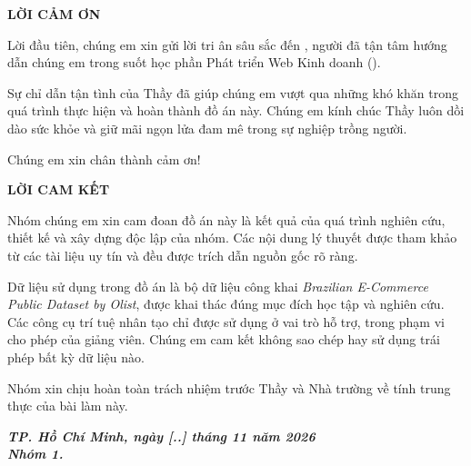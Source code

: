 
\clearpage
\thispagestyle{empty}
\setlength{\parskip}{6pt}  %

\begin{center}
{\bfseries\fontsize{13}{16}\selectfont LỜI CẢM ƠN}
\end{center}

Lời đầu tiên, chúng em xin gửi lời tri ân sâu sắc đến \CoverSupervisor, người đã tận tâm
hướng dẫn chúng em trong suốt học phần Phát triển Web Kinh doanh (\CoverCourseCode).

Sự chỉ dẫn tận tình của Thầy đã giúp chúng em vượt qua những khó khăn trong quá trình
thực hiện và hoàn thành đồ án này. Chúng em kính chúc Thầy luôn dồi dào sức khỏe và giữ
mãi ngọn lửa đam mê trong sự nghiệp trồng người.

Chúng em xin chân thành cảm ơn!

\vspace{0.4cm}

\begin{center}
{\bfseries\fontsize{13}{16}\selectfont LỜI CAM KẾT}
\end{center}

Nhóm chúng em xin cam đoan đồ án này là kết quả của quá trình nghiên cứu, thiết kế và
xây dựng độc lập của nhóm. Các nội dung lý thuyết được tham khảo từ các tài liệu uy tín
và đều được trích dẫn nguồn gốc rõ ràng.

Dữ liệu sử dụng trong đồ án là bộ dữ liệu công khai \textit{Brazilian E-Commerce Public
Dataset by Olist}, được khai thác đúng mục đích học tập và nghiên cứu. Các công cụ trí
tuệ nhân tạo chỉ được sử dụng ở vai trò hỗ trợ, trong phạm vi cho phép của giảng viên.
Chúng em cam kết không sao chép hay sử dụng trái phép bất kỳ dữ liệu nào.

Nhóm xin chịu hoàn toàn trách nhiệm trước Thầy và Nhà trường về tính trung thực của bài
làm này.

\vspace{0.4cm}

\begin{flushright}
\bfseries\itshape
TP. Hồ Chí Minh, ngày [..] tháng 11 năm 2026\\[0.2cm]
Nhóm 1.
\end{flushright}

\setlength{\parskip}{0pt}
